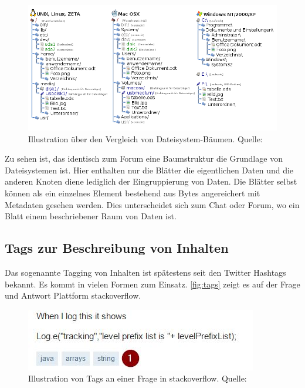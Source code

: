 \documentclass[a4paper]{article}
\begin{document}
	\begin{figure}[H] 
		\includegraphics[width=\linewidth]{../Bilder/filesystem.png}
		\caption{
			Illustration über den Vergleich von Dateisystem-Bäumen.
			Quelle: \cite{filesytsem}
		}
		\label{fig:filesytsem}
	\end{figure}
	
	Zu sehen ist, das identisch zum Forum eine Baumstruktur die Grundlage von
	Dateisystemen ist. Hier enthalten nur die Blätter die eigentlichen Daten und die
	anderen Knoten diene lediglich der Eingruppierung von Daten. Die Blätter selbst
	können als ein einzelnes Element bestehend aus Bytes angereichert mit Metadaten
	gesehen werden.	Dies unterscheidet sich zum Chat oder Forum, wo ein Blatt einem
	beschriebener Raum von Daten ist. 
	
	\newpage
	\subsection{Tags zur Beschreibung von Inhalten}
	\label{sec:tags}
	
	Das sogenannte Tagging von Inhalten ist spätestens seit den Twitter Hashtags
	bekannt. Es kommt in vielen Formen zum Einsatz. \autoref{fig:tags} zeigt es
	auf der Frage und Antwort Plattform stackoverflow.
	
	\begin{figure}[H] 
		\centerline{
			\includegraphics{../Bilder/tags.jpg}
		}
		\caption{
			Illustration von Tags an einer Frage in stackoverflow.
			Quelle: \cite{stackoverflow}
		}
		\label{fig:tags}
	\end{figure}
	
\end{document}
